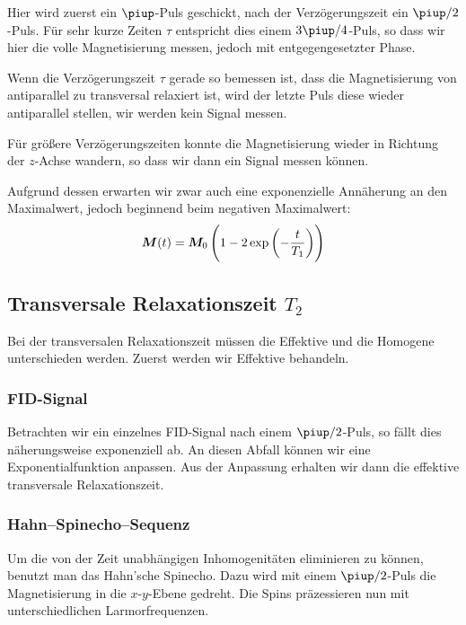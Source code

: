 Hier wird zuerst ein $\piup$-Puls geschickt, nach der Verzögerungszeit ein
$\piup/2$-Puls. Für sehr kurze Zeiten $\tau$ entspricht dies einem
$3\piup/4$-Puls, so dass wir hier die volle Magnetisierung messen, jedoch mit
entgegengesetzter Phase.

Wenn die Verzögerungszeit $\tau$ gerade so bemessen ist, dass die Magnetisierung von
antiparallel zu transversal relaxiert ist, wird der letzte Puls diese wieder
antiparallel stellen, wir werden kein Signal messen.

Für größere Verzögerungszeiten konnte die Magnetisierung wieder in Richtung der
$z$-Achse wandern, so dass wir dann ein Signal messen können.

Aufgrund dessen erwarten wir zwar auch eine exponenzielle Annäherung an den
Maximalwert, jedoch beginnend beim negativen Maximalwert:
\parencite[Formel~P443.4]{physik412-Anleitung}
\begin{equation}
    \label{eq:M/exp/2}
    \vec M(t) = \vec M_0 \del{1 - 2 \exp\del{- \frac{t}{T_1}}}
\end{equation}

\subsection{Transversale Relaxationszeit $T_2$}

Bei der transversalen Relaxationszeit müssen die Effektive und die Homogene
unterschieden werden. Zuerst werden wir Effektive behandeln.

\subsubsection{FID-Signal}

Betrachten wir ein einzelnes FID-Signal nach einem $\piup/2$-Puls, so fällt dies
näherungsweise exponenziell ab. An diesen Abfall können wir eine
Exponentialfunktion anpassen. Aus der Anpassung erhalten wir dann die effektive
transversale Relaxationszeit.

\subsubsection{Hahn–Spinecho–Sequenz}

Um die von der Zeit unabhängigen Inhomogenitäten eliminieren zu können, benutzt
man das Hahn'sche Spinecho. Dazu wird mit einem $\piup/2$-Puls die
Magnetisierung in die $x$-$y$-Ebene gedreht. Die Spins präzessieren nun mit
unterschiedlichen Larmorfrequenzen.

